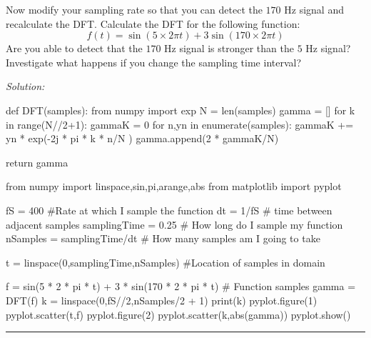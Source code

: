 \begin{enumerate}
\begin{enumerate}
\subprob Now modify your sampling rate so that you can detect the
$170$ Hz signal and recalculate the DFT.
\subprob Calculate the DFT for the
following function:
\begin{equation}
f(t) = \sin(5 \times 2 \pi t) + 3 \sin(170 \times 2 \pi t)
\end{equation}
Are you able to detect that the $170$ Hz signal is stronger than the
$5$ Hz signal?
\subprob  Investigate what happens if you change the sampling time interval? 
\end{enumerate}
\end{enumerate}
\ifsolutions
\textit{Solution:}\\
\begin{codeexample}
\begin{VerbatimOut}{\listingFile}

def DFT(samples):
    from numpy import exp
    N = len(samples)
    gamma = []
    for k in range(N//2+1):
        gammaK = 0
        for n,yn in enumerate(samples):
            gammaK += yn * exp(-2j * pi * k * n/N )
        gamma.append(2 * gammaK/N)

    return gamma


from numpy import linspace,sin,pi,arange,abs
from matplotlib import pyplot

fS = 400  #Rate at which I sample the function
dt = 1/fS  # time between adjacent samples
samplingTime = 0.25  # How long do I sample my function
nSamples = samplingTime/dt  # How many samples am I going to take


t = linspace(0,samplingTime,nSamples)  #Location of samples in domain

f = sin(5 * 2 * pi * t) + 3 * sin(170 * 2 * pi * t) # Function samples
gamma = DFT(f)
k = linspace(0,fS//2,nSamples/2 + 1)
print(k)
pyplot.figure(1)
pyplot.scatter(t,f)
pyplot.figure(2)
pyplot.scatter(k,abs(gamma))
pyplot.show()
\end{VerbatimOut}
\end{codeexample}
\else
\noindent\rule{5 in}{0.01 in}
\fi

